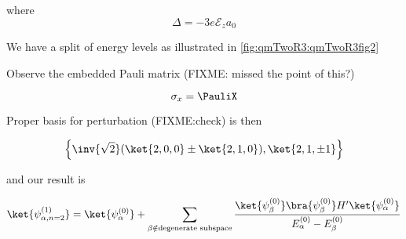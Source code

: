 {where
\begin{equation}\label{eqn:qmTwoR3:590}
\Delta = -3 e \mathcal{E}_z a_0
\end{equation}

We have a split of energy levels as illustrated in \cref{fig:qmTwoR3:qmTwoR3fig2}


Observe the embedded Pauli matrix (FIXME: missed the point of this?)

\begin{equation}\label{eqn:qmTwoR3:330}
\sigma_x = \PauliX
\end{equation}

Proper basis for perturbation (FIXME:check) is then

\begin{equation}\label{eqn:qmTwoR3:350}
\left\{
\inv{\sqrt{2}}
( 
\ket{2,0,0} 
\pm 
\ket{2,1,0} 
), 
\ket{2, 1, \pm 1}
\right\}
\end{equation}

and our result is

\begin{equation}\label{eqn:qmTwoR3:370}
\ket{\psi_{\alpha, n=2}^{(1)}} = 
\ket{\psi_{\alpha}^{(0)}} 
+\sum_{\beta \notin \text{degenerate subspace}} \frac{ 
\ket{\psi_\beta^{(0)}} \bra{\psi_\beta^{(0)}} H' \ket{\psi_\alpha^{(0)}} 
}{
E_\alpha^{(0)} 
-E_\beta^{(0)} 
}
\end{equation}
}

